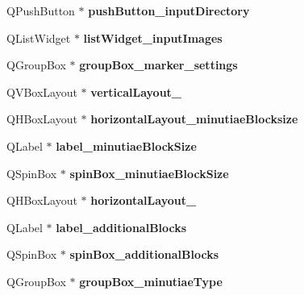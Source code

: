 \begin{DoxyCompactItemize}
Q\+Push\+Button $\ast$ {\bfseries push\+Button\+\_\+input\+Directory}
\item 
\mbox{\label{class_ui___main_window_a5217aad9b3551290f41652e706e62950}} 
Q\+List\+Widget $\ast$ {\bfseries list\+Widget\+\_\+input\+Images}
\item 
\mbox{\label{class_ui___main_window_a16aab3491f90f8aa7a20f3fff53b2755}} 
Q\+Group\+Box $\ast$ {\bfseries group\+Box\+\_\+marker\+\_\+settings}
\item 
\mbox{\label{class_ui___main_window_ab309edd7733aa8400ffaab77bc0051bf}} 
Q\+V\+Box\+Layout $\ast$ {\bfseries vertical\+Layout\+\_}
\item 
\mbox{\label{class_ui___main_window_af0a9d9c8a9729b86ebb684b63b8489da}} 
Q\+H\+Box\+Layout $\ast$ {\bfseries horizontal\+Layout\+\_\+minutiae\+Blocksize}
\item 
\mbox{\label{class_ui___main_window_a8232f5a03c94d9f0513654dbdc2891f6}} 
Q\+Label $\ast$ {\bfseries label\+\_\+minutiae\+Block\+Size}
\item 
\mbox{\label{class_ui___main_window_ac33c27838f86463c75071f8b028eb55a}} 
Q\+Spin\+Box $\ast$ {\bfseries spin\+Box\+\_\+minutiae\+Block\+Size}
\item 
\mbox{\label{class_ui___main_window_a488ae2286c0922552e7a39a756e337d3}} 
Q\+H\+Box\+Layout $\ast$ {\bfseries horizontal\+Layout\+\_}
\item 
\mbox{\label{class_ui___main_window_a593b25dc76adce99ab194132df67c83c}} 
Q\+Label $\ast$ {\bfseries label\+\_\+additional\+Blocks}
\item 
\mbox{\label{class_ui___main_window_a0994d74928bfda42b101f2e4d7958ab5}} 
Q\+Spin\+Box $\ast$ {\bfseries spin\+Box\+\_\+additional\+Blocks}
\item 
\mbox{\label{class_ui___main_window_a6d5e3efb50cebffd2d92e711cba781c8}} 
Q\+Group\+Box $\ast$ {\bfseries group\+Box\+\_\+minutiae\+Type}

\end{DoxyCompactItemize}
